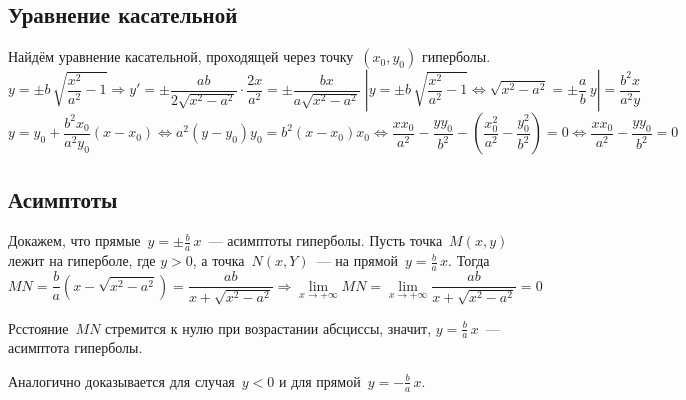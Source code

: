 \subsection{Уравнение касательной}
Найдём уравнение касательной, проходящей через точку~$(x_0, y_0)$ гиперболы.
\begin{equation*}
y = \pm b\,\sqrt{\frac{x^2}{a^2} - 1} \Rightarrow
y' = \pm\frac{ab}{2\sqrt{x^2 - a^2}} \cdot \frac{2x}{a^2} =
\pm\frac{bx}{a\sqrt{x^2 - a^2}} \;
\left|y = \pm b\,\sqrt{\frac{x^2}{a^2} - 1} \Leftrightarrow
\sqrt{x^2 - a^2} = \pm\frac{a}b\,y\right| =
\frac{b^2 x}{a^2 y}
\end{equation*}
\begin{equation*}
y = y_0 + \frac{b^2 x_0}{a^2 y_0} (x - x_0) \Leftrightarrow
a^2 (y - y_0) y_0 = b^2 (x - x_0) x_0 \Leftrightarrow
\frac{x x_0}{a^2} - \frac{y y_0}{b^2} - \left(\frac{x_0^2}{a^2} - \frac{y_0^2}{b^2} \right) = 0 \Leftrightarrow
\frac{x x_0}{a^2} - \frac{y y_0}{b^2} = 0
\end{equation*}

\subsection{Асимптоты}
Докажем, что прямые~$y = \pm\frac{b}a\,x$~--- асимптоты гиперболы.
Пусть точка~$M(x, y)$ лежит на гиперболе, где $y > 0$, а точка~$N(x, Y)$~--- на прямой~$y = \frac{b}a\,x$.
Тогда
\begin{equation*}
MN = \frac{b}a \left(x - \sqrt{x^2 - a^2}\right) =
\frac{ab}{x + \sqrt{x^2 - a^2}} \Rightarrow
\lim_{x \to +\infty} MN =
\lim_{x \to +\infty} \frac{ab}{x + \sqrt{x^2 - a^2}} = 0
\end{equation*}

Рсстояние~$MN$ стремится к нулю при возрастании абсциссы, значит, $y = \frac{b}a\,x$~--- асимптота гиперболы.

Аналогично доказывается для случая~$y < 0$ и для прямой~$y = -\frac{b}a\,x$.